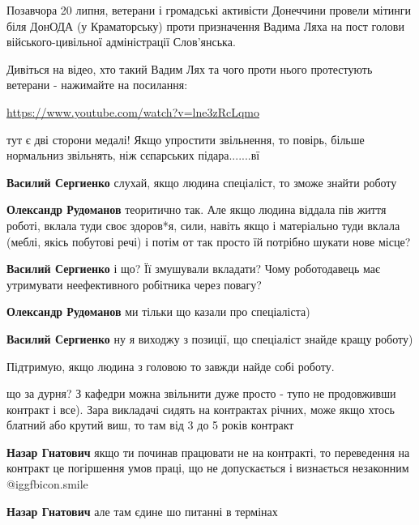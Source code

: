 \begin{itemize}

Позавчора 20 липня, ветерани і громадські активісти Донеччини провели мітинги
біля ДонОДА (у Краматорську) проти призначення Вадима Ляха на пост голови
війського-цивільної адміністрації Слов'янська.

Дивіться на відео, хто такий Вадим Лях та чого проти нього протестують ветерани
- нажимайте на посилання:

\url{https://www.youtube.com/watch?v=lne3zRcLqmo}

тут є дві сторони медалі! Якщо упростити звільнення, то повірь, більше
нормальниз звільнять, ніж сєпарських підара.......вї

\begin{itemize} %
\textbf{Василий Сергиенко} слухай, якщо людина спеціаліст, то зможе знайти роботу

\textbf{Олександр Рудоманов} теоритично так. Але якщо людина віддала пів життя роботі, вклала туди своє здоров*я, сили, навіть якщо і матеріально туди вклала (меблі, якісь побутові речі) і потім от так просто їй потрібно шукати нове місце?


\textbf{Василий Сергиенко} і що? Її змушували вкладати?
Чому роботодавець має утримувати неефективного робітника через повагу?

\textbf{Олександр Рудоманов} ми тільки що казали про спеціаліста)


\textbf{Василий Сергиенко} ну я виходжу з позиції, що спеціаліст знайде кращу роботу)

Підтримую, якщо людина з головою то завжди найде собі роботу.
\end{itemize} %


що за дурня? З кафедри можна звільнити дуже просто - тупо не продовживши
контракт і все). Зара викладачі сидять на контрактах річних, може якщо хтось
блатний або крутий виш, то там від 3 до 5 років контракт

\begin{itemize} %
\textbf{Назар Гнатович} якщо ти починав працювати не на контракті, то переведення на контракт це погіршення умов праці, що не допускається і визнається незаконним  @igg{fbicon.smile} 


\textbf{Назар Гнатович} але там єдине шо питанні в термінах


\end{itemize}
\end{itemize}
